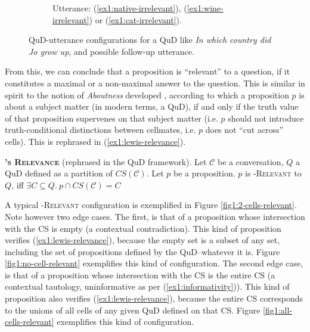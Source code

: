 \begin{figure}[H]
\begin{subfigure}[r]{.24\linewidth}
		\caption{Utterance: (\ref{ex1:native-irrelevant}), (\ref{ex1:wine-irrelevant}) or (\ref{ex1:cat-irrelevant}).}
	\end{subfigure}
	\caption{QuD-utterance configurations for a QuD like \textit{In which country did Jo grow up}, and possible follow-up utterance.}\label{fig1:relevance-example}
\end{figure}

From this, we can conclude that a proposition is ``relevant'' to a question, if it constitutes a maximal or a non-maximal answer to the question. This is similar in spirit to the notion of \textit{Aboutness} developed \cite{Lewis1988}, according to which a proposition $p$ is about a subject matter (in modern terms, a QuD), if and only if the truth value of that proposition supervenes on that subject matter (i.e. $p$ should not introduce truth-conditional distinctions between cellmates, i.e. $p$ does not ``cut across'' cells). This is rephrased in (\ref{ex1:lewis-relevance}). 

\begin{exe}
	\ex\label{ex1:lewis-relevance} {\textsc{\textbf{\citeauthor{Lewis1988}'s Relevance}} (rephrased in the QuD framework). Let $\mathcal{C}$ be a conversation, $Q$ a QuD defined as a partition of $CS(\mathcal{C})$. Let $p$ be a proposition. $p$ is \textsc{\citeauthor{Lewis1988}-Relevant} to $Q$, iff $\exists C \subseteq Q. \ p \cap CS(\mathcal{C}) = C$}
\end{exe}


A typical \textsc{\citeauthor{Lewis1988}-Relevant} configuration is exemplified in Figure \ref{fig1:2-cells-relevant}. Note however two edge cases. The first, is that of a proposition whose intersection with the CS is empty (a contextual contradiction). This kind of proposition verifies (\ref{ex1:lewis-relevance}), because the empty set is a subset of any set, including the set of propositions defined by the QuD--whatever it is. Figure \ref{fig1:no-cell-relevant} exemplifies this kind of configuration. The second edge case, is that of a proposition whose intersection with the CS is the entire CS (a contextual tautology, uninformative as per (\ref{ex1:informativity})). This kind of proposition also verifies (\ref{ex1:lewis-relevance}), because the entire CS corresponds to the unions of all cells of any given QuD defined on that CS. Figure \ref{fig1:all-cells-relevant} exemplifies this kind of configuration. 

